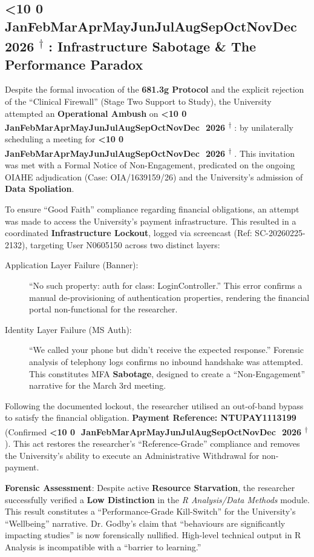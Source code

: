 \documentclass{EMBASSY}
\DeclareRobustCommand{\gmt}[3]{%
    \texorpdfstring{%
        {\color{DateGold}\textbf{%
            \ifnum#1<10 0\fi#1\,\textperiodcentered\,%
            \ifcase#2\or Jan\or Feb\or Mar\or Apr\or May\or Jun\or Jul\or Aug\or Sep\or Oct\or Nov\or Dec\fi
            \,\textperiodcentered\,20#3%
            \textsuperscript{$\dagger$}%
        }}%
    }{%
        (#1/#2/#3)%
    }%
}
\begin{document}
\subsection{\gmt{25}{2}{26}: Infrastructure Sabotage \& The Performance Paradox}
Despite the formal invocation of the \textbf{681.3g Protocol} and the explicit rejection of the ``Clinical Firewall'' (Stage Two Support to Study), the University attempted an \textbf{Operational Ambush} on \gmt{24}{2}{26}: by unilaterally scheduling a meeting for \gmt{3}{3}{26}. This invitation was met with a Formal Notice of Non-Engagement, predicated on the ongoing OIAHE adjudication (Case: OIA/1639159/26) and the University’s admission of \textbf{Data Spoliation}.

To ensure ``Good Faith'' compliance regarding financial obligations, an attempt was made to access the University's payment infrastructure. This resulted in a coordinated \textbf{Infrastructure Lockout}, logged via screencast (Ref: SC-20260225-2132), targeting User N0605150 across two distinct layers:

\begin{description}
	\item[Application Layer Failure (Banner):] ``No such property: auth for class: LoginController.'' This error confirms a manual de-provisioning of authentication properties, rendering the financial portal non-functional for the researcher.
	\item[Identity Layer Failure (MS Auth):] ``We called your phone but didn't receive the expected response.'' Forensic analysis of telephony logs confirms no inbound handshake was attempted. This constitutes MFA \textbf{Sabotage}, designed to create a ``Non-Engagement'' narrative for the March 3rd meeting.
\end{description}

\noindent Following the documented lockout, the researcher utilised an out-of-band bypass to satisfy the financial obligation. \textbf{Payment Reference: NTUPAY1113199} (Confirmed \gmt{25}{2}{26}). This act restores the researcher’s ``Reference-Grade'' compliance and removes the University's ability to execute an Administrative Withdrawal for non-payment.

\textbf{Forensic Assessment}: Despite active \textbf{Resource Starvation}, the researcher successfully verified a \textbf{Low Distinction} in the \textit{R Analysis/Data Methods} module. This result constitutes a ``Performance-Grade Kill-Switch'' for the University’s ``Wellbeing'' narrative. Dr. Godby’s claim that ``behaviours are significantly impacting studies'' is now forensically nullified. High-level technical output in R Analysis is incompatible with a ``barrier to learning.''
\end{document}
